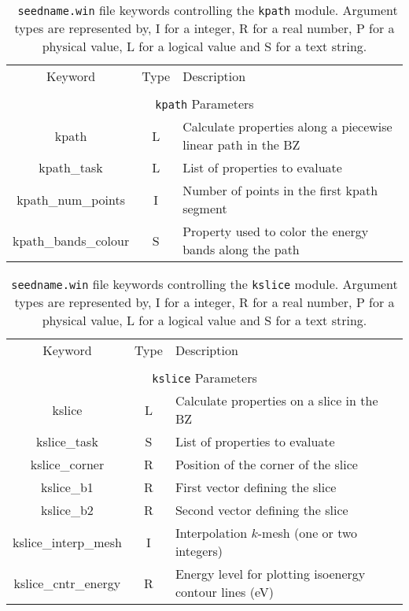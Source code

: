 \begin{table}[hH!]
\begin{center}
\begin{tabular}{|c|c|p{6cm}|}
  \hline
  Keyword & Type & Description \\
  &      &             \\
  \hline\hline
  \multicolumn{3}{|c|}{{\tt kpath} Parameters} \\
  \hline
  {\sc kpath}  & L & Calculate properties along a piecewise linear path in the BZ \\
  {\sc kpath\_task}& L & List of properties to evaluate\\
  {\sc kpath\_num\_points}& I & Number of points in the first kpath segment\\
  {\sc kpath\_bands\_colour}& S & Property used to color the energy bands along the path\\
  \hline
\end{tabular}
\caption[Parameter file keywords controlling the kpath module.]  {{\tt
    seedname.win} file keywords controlling the {\tt kpath}
  module. Argument types are represented by, I for a integer, R for a
  real number, P for a physical value, L for a logical value and S for
  a text string.}
\label{parameter_keywords_kpath}
\end{center}
\end{table}

\begin{table}[hH!]
\begin{center}
\begin{tabular}{|c|c|p{6cm}|}
  \hline
  Keyword & Type & Description \\
  &      &             \\
  \hline\hline
  \multicolumn{3}{|c|}{{\tt kslice} Parameters} \\
  \hline
  {\sc kslice}  & L & Calculate properties on a slice in the BZ \\
  {\sc kslice\_task}& S & List of properties to evaluate\\
  {\sc kslice\_corner}& R & Position of the corner of the slice\\
  {\sc kslice\_b1}& R & First vector defining the slice\\
  {\sc kslice\_b2}& R & Second vector defining the slice\\
  {\sc kslice\_interp\_mesh}& I & Interpolation $k$-mesh (one or two integers)\\
  {\sc kslice\_cntr\_energy}& R & Energy level for  plotting isoenergy contour lines (eV)\\
  \hline
\end{tabular}
\caption[Parameter file keywords controlling the kslice module.]
{{\tt seedname.win} file keywords controlling the {\tt kslice}
  module. Argument types are represented by, I for a integer, R for a
  real number, P for a physical value, L for a logical value and S for
  a text string.}
\label{parameter_keywords_kslice}
\end{center}
\end{table}



